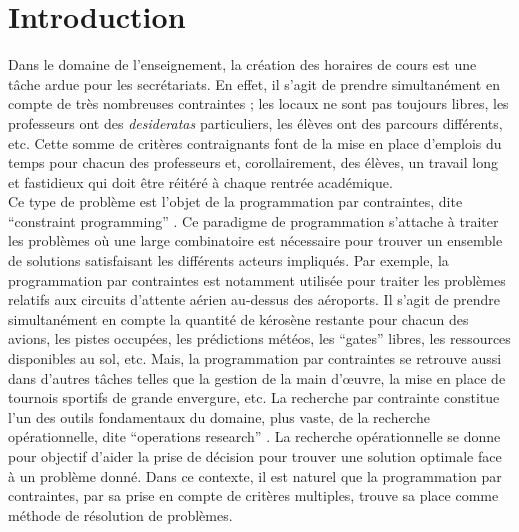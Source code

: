 

\chapter*{Introduction}

Dans le domaine de l'enseignement, la création des horaires de cours est une tâche ardue pour les secrétariats. En effet, il s'agit de prendre simultanément en compte de très nombreuses contraintes ; les locaux ne sont pas toujours libres, les professeurs ont des \textit{desideratas} particuliers, les élèves ont des parcours différents, etc. Cette somme de critères contraignants font de la mise en place d'emplois du temps pour chacun des professeurs et, corollairement, des élèves, un travail long et fastidieux qui doit être réitéré à chaque rentrée académique.\\
\newline
\indent
Ce type de problème est l'objet de la programmation par contraintes, dite \enquote{constraint programming} \citep{Muller_2005}. Ce paradigme de programmation s'attache à traiter les problèmes où une large combinatoire est nécessaire pour trouver un ensemble de solutions satisfaisant les différents acteurs impliqués. Par exemple, la programmation par contraintes est notamment utilisée pour traiter les problèmes relatifs aux circuits d'attente aérien au-dessus des aéroports. Il s'agit de prendre simultanément en compte la quantité de kérosène restante pour chacun des avions, les pistes occupées, les prédictions météos, les \enquote{gates} libres, les ressources disponibles au sol, etc. Mais, la programmation par contraintes se retrouve aussi dans d'autres tâches telles que la gestion de la main d’œuvre, la mise en place de tournois sportifs de grande envergure, etc.
\newline
\indent
La recherche par contrainte constitue l'un des outils fondamentaux du domaine, plus vaste, de la 
recherche opérationnelle, dite \enquote{operations research} \citep{Scharlig_1985}. La recherche opérationnelle se donne pour objectif d'aider la prise de décision pour trouver une solution optimale face à un problème donné. Dans ce contexte, il est naturel que la programmation par contraintes, par sa prise en compte de critères multiples, trouve sa place comme méthode de résolution de problèmes.\\
